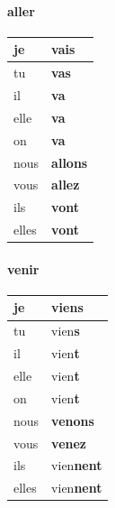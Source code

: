\documentclass[9pt, oneside]{article}
\begin{document}
\paragraph*{aller}
\begin{tabular}{l|l}
	je & {\bfseries vais}\\
	\hline
	tu & {\bfseries vas}\\
	\hline
	il & {\bfseries va}\\
	\hline
	elle & {\bfseries va}\\
	\hline
	on & {\bfseries va}\\
	\hline
	nous & {\bfseries allons}\\
	\hline
	vous & {\bfseries allez}\\
	\hline
	ils & {\bfseries vont}\\
	\hline
	elles & {\bfseries vont}\\
\end{tabular}

\paragraph*{venir}
\begin{tabular}{l|l}
	je & vien{\bfseries s}\\
	\hline
	tu & vien{\bfseries s}\\
	\hline
	il & vien{\bfseries t}\\
	\hline
	elle & vien{\bfseries t}\\
	\hline
	on & vien{\bfseries t}\\
	\hline
	nous & {\bfseries venons}\\
	\hline
	vous & {\bfseries venez}\\
	\hline
	ils & vien{\bfseries nent}\\
	\hline
	elles & vien{\bfseries nent}\\
\end{tabular}
\end{document}
